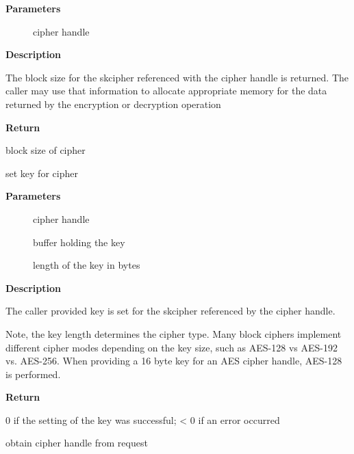 \documentclass[a4paper,8pt,english]{sphinxmanual}
\begin{document}
\textbf{Parameters}
\begin{description}
\item[{}] \leavevmode
cipher handle

\end{description}

\textbf{Description}

The block size for the skcipher referenced with the cipher handle is
returned. The caller may use that information to allocate appropriate
memory for the data returned by the encryption or decryption operation

\textbf{Return}

block size of cipher

\begin{fulllineitems}
\label{crypto/api-skcipher:c.crypto_skcipher_setkey}
set key for cipher

\end{fulllineitems}


\textbf{Parameters}
\begin{description}
\item[{}] \leavevmode
cipher handle

\item[{}] \leavevmode
buffer holding the key

\item[{}] \leavevmode
length of the key in bytes

\end{description}

\textbf{Description}

The caller provided key is set for the skcipher referenced by the cipher
handle.

Note, the key length determines the cipher type. Many block ciphers implement
different cipher modes depending on the key size, such as AES-128 vs AES-192
vs. AES-256. When providing a 16 byte key for an AES cipher handle, AES-128
is performed.

\textbf{Return}

0 if the setting of the key was successful; \textless{} 0 if an error occurred

\begin{fulllineitems}
\label{crypto/api-skcipher:c.crypto_skcipher_reqtfm}
obtain cipher handle from request

\end{fulllineitems}
\end{document}
